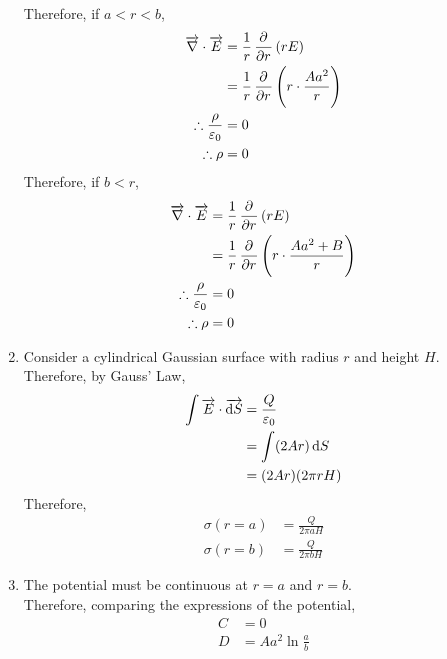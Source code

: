 \documentclass[fleqn, a4paper, 12pt, twoside]{article}
\theoremstyle{definition}
\theoremstyle{theorem}
\begin{document}
\begin{solution}
\begin{enumerate}[leftmargin = *]
\begin{align*}
			\end{align*}
			Therefore, if $a < r < b$,
			\begin{align*}
				\overrightarrow{\nabla} \cdot \overrightarrow{E} & = \frac{1}{r} \dpd{}{r} \left( r E \right)                     \\
                                                                                 & = \frac{1}{r} \dpd{}{r} \left( r \cdot \frac{A a^2}{r} \right) \\
				\therefore \frac{\rho}{\varepsilon_0}            & = 0                                                            \\
				\therefore \rho                                  & = 0
			\end{align*}
			Therefore, if $b < r$,
			\begin{align*}
				\overrightarrow{\nabla} \cdot \overrightarrow{E} & = \frac{1}{r} \dpd{}{r} \left( r E \right)                         \\
                                                                                 & = \frac{1}{r} \dpd{}{r} \left( r \cdot \frac{A a^2 + B}{r} \right) \\
				\therefore \frac{\rho}{\varepsilon_0}            & = 0                                                                \\
				\therefore \rho                                  & = 0
			\end{align*}
		\item
			Consider a cylindrical Gaussian surface with radius $r$ and height $H$.\\
			Therefore, by Gauss' Law,
			\begin{align*}
				\int \overrightarrow{E} \cdot \overrightarrow{\dif S} & = \frac{Q}{\varepsilon_0} \\
                                                                                      & = \int (2 A r) \dif S     \\
                                                                                      & = (2 A r) (2 \pi r H)     \\
			\end{align*}
			Therefore,
			\begin{align*}
				\sigma(r = a) & = \frac{Q}{2 \pi a H} \\
				\sigma(r = b) & = \frac{Q}{2 \pi b H}
			\end{align*}
		\item
			The potential must be continuous at $r = a$ and $r = b$.\\
			Therefore, comparing the expressions of the potential,
			\begin{align*}
				C & = 0 \\
				D & = A a^2 \ln \frac{a}{b}
			\end{align*}
	\end{enumerate}
\end{solution}
\end{document}
